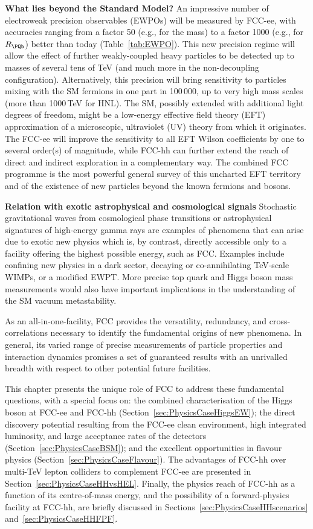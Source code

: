 \textbf{What lies beyond the Standard Model?} 
An impressive number of electroweak precision observables (EWPOs) will be measured by FCC-ee, 
with accuracies ranging from a factor 50 (e.g., for the \PW mass) to a factor 1000 (e.g., for $R_{\PQb}$) better than today (Table~\ref{tab:EWPO}). 
This new precision regime will allow the effect of further weakly-coupled heavy particles to be detected up to masses of several tens of TeV 
(and much more in the non-decoupling configuration). 
Alternatively, this precision will bring sensitivity to particles mixing with the SM fermions in one part in 100\,000, 
up to very high mass scales (more than 1000\,TeV for HNL). 
The SM, possibly extended with additional light degrees of freedom, 
might be a low-energy effective field theory (EFT) approximation of a microscopic, ultraviolet (UV) theory from which it originates. 
The FCC-ee will improve the sensitivity to all EFT Wilson coefficients by one to several order(s) of magnitude, 
while FCC-hh can further extend the reach of direct and indirect exploration in a complementary way. 
The combined FCC programme is the most powerful general survey of this uncharted EFT territory 
and of the existence of new particles beyond the known fermions and bosons.

\textbf{Relation with exotic astrophysical and cosmological signals} 
Stochastic gravitational waves from cosmological phase transitions or astrophysical signatures of high-energy gamma rays 
are examples of phenomena that can arise due to exotic new physics which is, by contrast, 
directly accessible only to a facility offering the highest possible energy, such as FCC. 
Examples include confining new physics in a dark sector, decaying or co-annihilating TeV-scale WIMPs, or a modified EWPT. 
More precise top quark and Higgs boson mass measurements would also have important implications in the understanding of the SM vacuum metastability.

As an all-in-one-facility, FCC provides the versatility, redundancy, and cross-correlations ne\-cessary to identify the fundamental origins of new phenomena. 
In general, its varied range of precise measurements of particle properties and interaction dynamics 
promises a set of guaranteed results with an unrivalled breadth with respect to other potential future facilities.

This chapter presents the unique role of FCC to address these fundamental questions, with a special focus on: 
the combined characterisation of the Higgs boson at FCC-ee and FCC-hh (Section~\ref{sec:PhysicsCaseHiggsEW}); 
the direct discovery potential resulting from the FCC-ee clean environment, high integrated luminosity, and large acceptance rates of the detectors (Section~\ref{sec:PhysicsCaseBSM}); 
and the excellent opportunities in flavour physics (Section~\ref{sec:PhysicsCaseFlavour}). 
The advantages of FCC-hh over multi-TeV lepton colliders to complement FCC-ee are presented in Section~\ref{sec:PhysicsCaseHHvsHEL}. 
Finally, the physics reach of FCC-hh as a function of its centre-of-mass energy, 
and the possibility of a forward-physics facility at FCC-hh, 
are briefly discussed in Sections~\ref{sec:PhysicsCaseHHscenarios} and~\ref{sec:PhysicsCaseHHFPF}.

